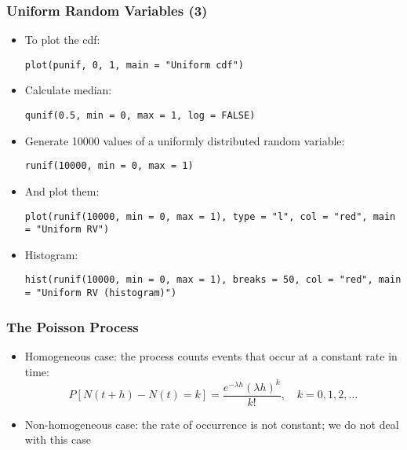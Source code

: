 \documentclass[10pt]{beamer}
\theoremstyle{definition}
\begin{document}
\begin{frame}[fragile]
\frametitle{Uniform Random Variables (3)}
\begin{itemize}
	\item To plot the cdf:
	\begin{lstlisting}[style = rstyle, breaklines]
	plot(punif, 0, 1, main = "Uniform cdf")
	\end{lstlisting}

	\item Calculate median:
	\begin{lstlisting}[style = rstyle, breaklines]
	qunif(0.5, min = 0, max = 1, log = FALSE)
	\end{lstlisting}

	\item Generate 10000 values of a uniformly distributed random variable:
	\begin{lstlisting}[style = rstyle, breaklines]
	runif(10000, min = 0, max = 1)
	\end{lstlisting}

	\item And plot them:
	\begin{lstlisting}[style = rstyle, breaklines]
	plot(runif(10000, min = 0, max = 1), type = "l", col = "red", main = "Uniform RV")
	\end{lstlisting}
	
	\item Histogram: 
	\begin{lstlisting}[style = rstyle, breaklines]
	hist(runif(10000, min = 0, max = 1), breaks = 50, col = "red", main = "Uniform RV (histogram)")
	\end{lstlisting}
\end{itemize}
\end{frame}

\begin{frame}[fragile]
\frametitle{The Poisson Process}
\begin{itemize}
	\item Homogeneous case: the process counts events that occur at a constant rate in time:
	\[
		P[N(t+h) - N(t) = k] = \frac{e^{-\lambda h}(\lambda h)^{k}}{k!}, \quad k = 0, 1, 2,\ldots
	\]
	
	\item Non-homogeneous case: the rate of occurrence is not constant; we do not deal with this case
\end{itemize}
\end{frame} 
\end{document}

